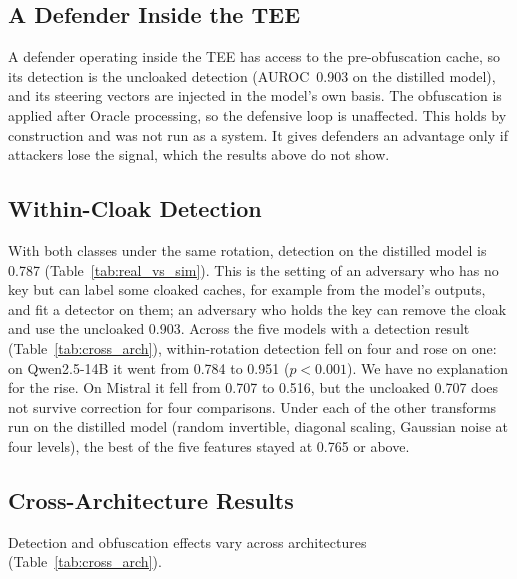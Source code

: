 \subsection{A Defender Inside the TEE}

A defender operating inside the TEE has access to the pre-obfuscation
cache, so its detection is the uncloaked detection (AUROC~0.903 on the
distilled model), and its steering vectors are injected in the model's own
basis. The obfuscation is applied after Oracle processing, so the
defensive loop is unaffected. This holds by construction and was not run
as a system. It gives defenders an advantage only if attackers lose the
signal, which the results above do not show.

\subsection{Within-Cloak Detection}
\label{sec:withincloak}

With both classes under the same rotation, detection on the distilled
model is 0.787 (Table~\ref{tab:real_vs_sim}). This is the setting of an
adversary who has no key but can label some cloaked caches, for example
from the model's outputs, and fit a detector on them; an adversary who
holds the key can remove the cloak and use the uncloaked 0.903. Across the
five models with a detection result (Table~\ref{tab:cross_arch}),
within-rotation detection fell on four and rose on one: on Qwen2.5-14B it
went from 0.784 to 0.951 ($p < 0.001$). We have no explanation for the
rise. On Mistral it
fell from 0.707 to 0.516, but the uncloaked 0.707 does not survive
correction for four comparisons. Under each of the other transforms run
on the distilled model (random invertible, diagonal scaling, Gaussian
noise at four levels), the best of the five features stayed at 0.765 or
above.

\subsection{Cross-Architecture Results}

Detection and obfuscation effects vary across architectures
(Table~\ref{tab:cross_arch}).

